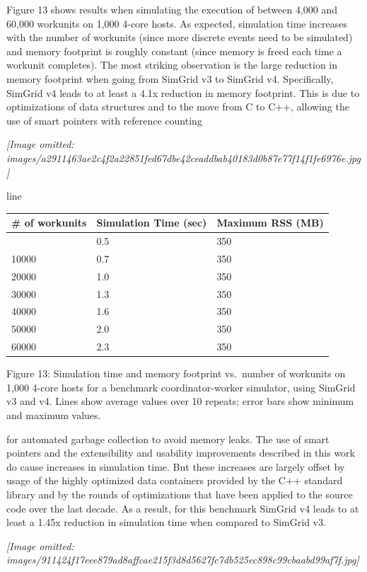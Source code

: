 \documentclass[
]{article}
\newcounter{none} %
\begin{document}
Figure 13 shows results when simulating the execution of between 4,000
and 60,000 workunits on 1,000 4-core hosts. As expected, simulation time
increases with the number of workunits (since more discrete events need
to be simulated) and memory footprint is roughly constant (since memory
is freed each time a workunit completes). The most striking observation
is the large reduction in memory footprint when going from SimGrid v3 to
SimGrid v4. Specifically, SimGrid v4 leads to at least a 4.1x reduction
in memory footprint. This is due to optimizations of data structures and
to the move from C to C++, allowing the use of smart pointers with
reference counting

\textit{[Image omitted: images/a2911463ae2c4f2a22851fed67dbe42ceaddbab40183d0b87e77f14f1fe6976e.jpg]}

line

{\def\LTcaptype{none} %
\begin{longtable}[]{@{}lll@{}}
\toprule\noalign{}
\# of workunits & Simulation Time (sec) & Maximum RSS (MB) \\
\midrule\noalign{}
\endhead
\bottomrule\noalign{}
\endlastfoot
0 & 0.5 & 350 \\
10000 & 0.7 & 350 \\
20000 & 1.0 & 350 \\
30000 & 1.3 & 350 \\
40000 & 1.6 & 350 \\
50000 & 2.0 & 350 \\
60000 & 2.3 & 350 \\
\end{longtable}
}

Figure 13: Simulation time and memory footprint vs.~number of workunits
on 1,000 4-core hosts for a benchmark coordinator-worker simulator,
using SimGrid v3 and v4. Lines show average values over 10 repeats;
error bars show minimum and maximum values.

for automated garbage collection to avoid memory leaks. The use of smart
pointers and the extensibility and usability improvements described in
this work do cause increases in simulation time. But these increases are
largely offset by usage of the highly optimized data containers provided
by the C++ standard library and by the rounds of optimizations that have
been applied to the source code over the last decade. As a result, for
this benchmark SimGrid v4 leads to at least a 1.45x reduction in
simulation time when compared to SimGrid v3.

\textit{[Image omitted: images/911424f17eee879ad8affcae215f3d8d5627fc7db525ec898c99cbaabd99af7f.jpg]}
\end{document}
